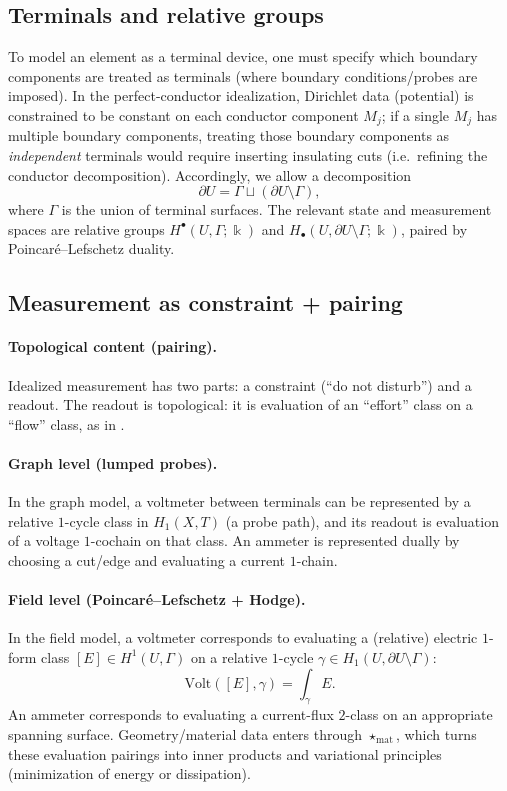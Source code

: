 \documentclass[11pt]{article}
\begin{document}
\subsection{Terminals and relative groups}
To model an element as a terminal device, one must specify which boundary components are treated as terminals (where boundary conditions/probes are imposed).
In the perfect-conductor idealization, Dirichlet data (potential) is constrained to be constant on each conductor component $M_j$; if a single $M_j$ has multiple boundary components, treating those boundary components as \emph{independent} terminals would require inserting insulating cuts (i.e.\ refining the conductor decomposition).
Accordingly, we allow a decomposition
\[
\partial U = \Gamma \sqcup (\partial U\setminus \Gamma),
\]
where $\Gamma$ is the union of terminal surfaces.
The relevant state and measurement spaces are relative groups $H^\bullet(U,\Gamma;\Bbbk)$ and $H_\bullet(U,\partial U\setminus \Gamma;\Bbbk)$, paired by Poincar\'e--Lefschetz duality.

\subsection{Measurement as constraint + pairing}
\paragraph{Topological content (pairing).}
Idealized measurement has two parts: a constraint (``do not disturb'') and a readout.
The readout is topological: it is evaluation of an ``effort'' class on a ``flow'' class, as in .

\paragraph{Graph level (lumped probes).}
In the graph model, a voltmeter between terminals can be represented by a relative $1$-cycle class in $H_1(X,T)$ (a probe path), and its readout is evaluation of a voltage $1$-cochain on that class.
An ammeter is represented dually by choosing a cut/edge and evaluating a current $1$-chain.

\paragraph{Field level (Poincar\'e--Lefschetz + Hodge).}
In the field model, a voltmeter corresponds to evaluating a (relative) electric $1$-form class $[E]\in H^1(U,\Gamma)$ on a relative $1$-cycle $\gamma\in H_1(U,\partial U\setminus \Gamma)$:
\[
\mathrm{Volt}([E],\gamma)=\int_\gamma E.
\]
An ammeter corresponds to evaluating a current-flux $2$-class on an appropriate spanning surface.
Geometry/material data enters through $\star_{\mathrm{mat}}$, which turns these evaluation pairings into inner products and variational principles (minimization of energy or dissipation).
\end{document}
